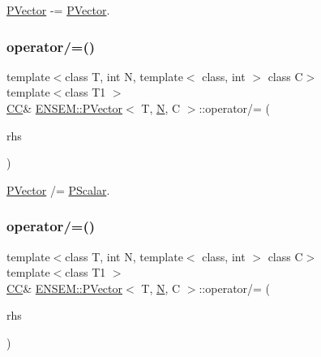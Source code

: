 \mbox{\hyperlink{classENSEM_1_1PVector}{P\+Vector}} -\/= \mbox{\hyperlink{classENSEM_1_1PVector}{P\+Vector}}. 

\mbox{\label{classENSEM_1_1PVector_a0da5cf65327a7044128b9a36a49b94e6}} 
\subsubsection{\texorpdfstring{operator/=()}{operator/=()}\hspace{0.1cm}{\footnotesize\ttfamily [1/2]}}
{\footnotesize\ttfamily template$<$class T, int N, template$<$ class, int $>$ class C$>$ \\
template$<$class T1 $>$ \\
\mbox{\hyperlink{classENSEM_1_1PVector_a92dc0a0a301a3dc96f7be5d337019bc7}{CC}}\& \mbox{\hyperlink{classENSEM_1_1PVector}{E\+N\+S\+E\+M\+::\+P\+Vector}}$<$ T, \mbox{\hyperlink{operator__name__util_8cc_a7722c8ecbb62d99aee7ce68b1752f337}{N}}, C $>$\+::operator/= (\begin{DoxyParamCaption}\item[{const \mbox{\hyperlink{classENSEM_1_1PScalar}{P\+Scalar}}$<$ T1 $>$ \&}]{rhs }\end{DoxyParamCaption})\hspace{0.3cm}{\ttfamily [inline]}}



\mbox{\hyperlink{classENSEM_1_1PVector}{P\+Vector}} /= \mbox{\hyperlink{classENSEM_1_1PScalar}{P\+Scalar}}. 

\mbox{\label{classENSEM_1_1PVector_a0da5cf65327a7044128b9a36a49b94e6}} 
\subsubsection{\texorpdfstring{operator/=()}{operator/=()}\hspace{0.1cm}{\footnotesize\ttfamily [2/2]}}
{\footnotesize\ttfamily template$<$class T, int N, template$<$ class, int $>$ class C$>$ \\
template$<$class T1 $>$ \\
\mbox{\hyperlink{classENSEM_1_1PVector_a92dc0a0a301a3dc96f7be5d337019bc7}{CC}}\& \mbox{\hyperlink{classENSEM_1_1PVector}{E\+N\+S\+E\+M\+::\+P\+Vector}}$<$ T, \mbox{\hyperlink{operator__name__util_8cc_a7722c8ecbb62d99aee7ce68b1752f337}{N}}, C $>$\+::operator/= (\begin{DoxyParamCaption}\item[{const \mbox{\hyperlink{classENSEM_1_1PScalar}{P\+Scalar}}$<$ T1 $>$ \&}]{rhs }\end{DoxyParamCaption})\hspace{0.3cm}{\ttfamily [inline]}}



